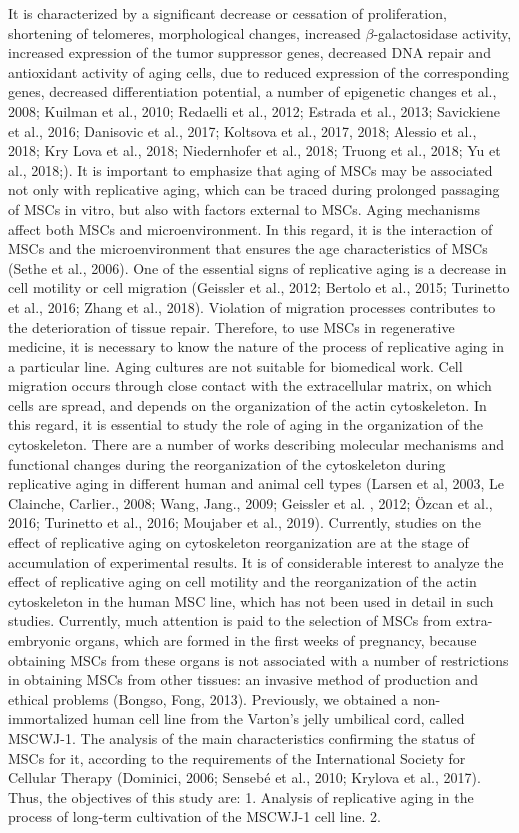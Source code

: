 \documentclass[english,authoryear]{elsarticle}
\begin{document}
It is characterized by a significant decrease or cessation of proliferation, shortening of telomeres, morphological changes, increased $\beta$-galactosidase activity, increased expression of the tumor suppressor genes, decreased DNA repair and antioxidant activity of aging cells, due to reduced expression of the corresponding genes, decreased differentiation potential, a number of epigenetic changes et al., 2008; Kuilman et al., 2010; Redaelli et al., 2012; Estrada et al., 2013; Savickiene et al., 2016; Danisovic et al., 2017; Koltsova et al., 2017, 2018; Alessio et al., 2018; Kry Lova et al., 2018; Niedernhofer et al., 2018; Truong et al., 2018; Yu et al., 2018;). It is important to emphasize that aging of MSCs may be associated not only with replicative aging, which can be traced during prolonged passaging of MSCs in vitro, but also with factors external to MSCs. Aging mechanisms affect both MSCs and microenvironment. In this regard, it is the interaction of MSCs and the microenvironment that ensures the age characteristics of MSCs (Sethe et al., 2006). One of the essential signs of replicative aging is a decrease in cell motility or cell migration (Geissler et al., 2012; Bertolo et al., 2015; Turinetto et al., 2016; Zhang et al., 2018). Violation of migration processes contributes to the deterioration of tissue repair. Therefore, to use MSCs in regenerative medicine, it is necessary to know the nature of the process of replicative aging in a particular line. Aging cultures are not suitable for biomedical work.
Cell migration occurs through close contact with the extracellular matrix, on which cells are spread, and depends on the organization of the actin cytoskeleton. In this regard, it is essential to study the role of aging in the organization of the cytoskeleton. There are a number of works describing molecular mechanisms and functional changes during the reorganization of the cytoskeleton during replicative aging in different human and animal cell types (Larsen et al, 2003, Le Clainche, Carlier., 2008; Wang, Jang., 2009; Geissler et al. , 2012; Özcan et al., 2016; Turinetto et al., 2016; Moujaber et al., 2019). Currently, studies on the effect of replicative aging on cytoskeleton reorganization are at the stage of accumulation of experimental results. It is of considerable interest to analyze the effect of replicative aging on cell motility and the reorganization of the actin cytoskeleton in the human MSC line, which has not been used in detail in such studies.
Currently, much attention is paid to the selection of MSCs from extra-embryonic organs, which are formed in the first weeks of pregnancy, because obtaining MSCs from these organs is not associated with a number of restrictions in obtaining MSCs from other tissues: an invasive method of production and ethical problems (Bongso, Fong, 2013). Previously, we obtained a non-immortalized human cell line from the Varton's jelly umbilical cord, called MSCWJ-1. The analysis of the main characteristics confirming the status of MSCs for it, according to the requirements of the International Society for Cellular Therapy (Dominici, 2006; Sensebé et al., 2010; Krylova et al., 2017). Thus, the objectives of this study are: 1. Analysis of replicative aging in the process of long-term cultivation of the MSCWJ-1 cell line. 2.
\end{document}
